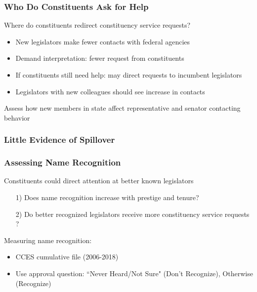 \documentclass[xcolor=dvipsnames]{beamer}
\begin{document}
          
          \begin{frame}
          \frametitle{Who Do Constituents Ask for Help}
          
          
          Where do constituents redirect constituency service requests?  
            
            \begin{itemize}
          \item New legislators make fewer contacts with federal agencies
          \item Demand interpretation: fewer request from constituents
          \item If constituents still need help: may direct requests to incumbent legislators
          \item Legislators with new colleagues should see \alert{increase} in contacts 
          \end{itemize}
          
          Assess how new members in state affect representative and senator contacting behavior
          
          
          \end{frame}
          
          
          \begin{frame}
          \frametitle{Little Evidence of Spillover}
          
          
          
          \end{frame}
          
          
          \begin{frame}
          \frametitle{Assessing Name Recognition}
          
          Constituents could direct attention at better known legislators
          
          \begin{itemize}
          \item[1)] Does name recognition increase with prestige and tenure? 
            \item[2)] \alert{Do better recognized legislators receive more constituency service requests ?}
          \end{itemize}
          
          Measuring name recognition: 
            \begin{itemize}
          \item CCES cumulative file (2006-2018)
          \item Use approval question: ``Never Heard/Not Sure" (Don't Recognize), Otherwise (Recognize)
          \end{itemize}
          
          \end{frame}
          
\end{document}
